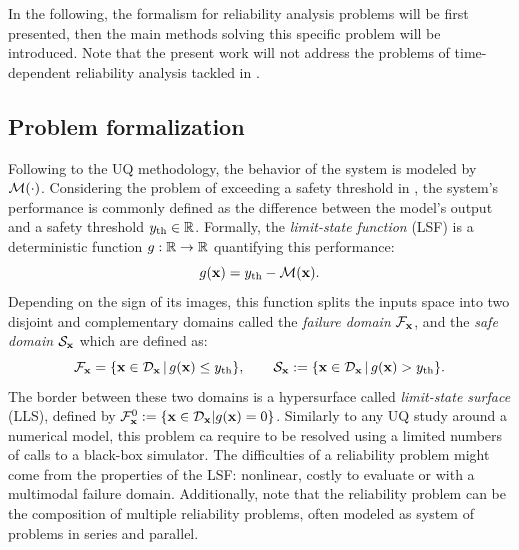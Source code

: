 In the following, the formalism for reliability analysis problems will be first presented, 
then the main methods solving this specific problem will be introduced.
Note that the present work will not address the problems of time-dependent reliability analysis tackled in \citet{hawchar_2017}. 

\subsection{Problem formalization}

Following to the UQ methodology, the behavior of the system is modeled by $\mathcal{M}(\cdot)$. 
Considering the problem of exceeding a safety threshold in , the system's performance is commonly defined as the difference between the model's output and a safety threshold $y_\mathrm{th}\in\mathbb{R}$. 
Formally, the \textit{limit-state function} (LSF) is a deterministic function $g:\mathbb{R}\rightarrow\mathbb{R}$ quantifying this performance: 
\begin{equation}
    g({\bf x}) = y_\mathrm{th} - \mathcal{M}({\bf x}).
\end{equation}
Depending on the sign of its images, this function splits the inputs space into two disjoint and complementary domains called  
the \textit{failure domain} $\mathcal{F}_{{\bf x}}$, and the \textit{safe domain} $\mathcal{S}_{\bf x}$ which are defined as:
\begin{equation}
    \mathcal{F}_{{\bf x}} = \{{\bf x} \in \mathcal{D}_{\bf x} \, | \,  g({\bf x}) \leq y_\mathrm{th}\}, \qquad 
    \mathcal{S}_{\bf x} := \{{\bf x} \in \mathcal{D}_{\bf x} \, | \, g({\bf x}) > y_\mathrm{th}\}. 
\end{equation}
The border between these two domains is a hypersurface called \textit{limit-state surface} (LLS), defined by $\mathcal{F}_{{\bf x}}^0 := \{{\bf x} \in \mathcal{D}_{\bf x} | g({\bf x}) = 0\}$.
Similarly to any UQ study around a numerical model, this problem ca require to be resolved using a limited numbers of calls to a black-box simulator.
The difficulties of a reliability problem might come from the properties of the LSF: nonlinear, costly to evaluate or with a multimodal failure domain. 
Additionally, note that the reliability problem can be the composition of multiple reliability problems, often modeled as system of problems in series and parallel.

